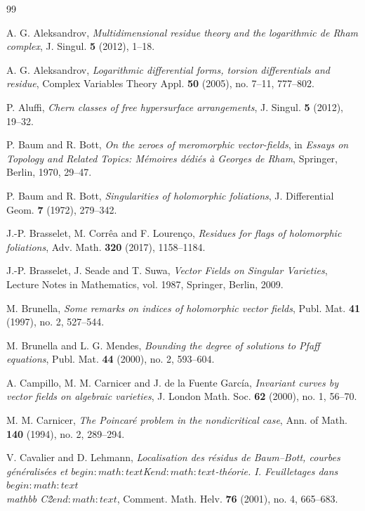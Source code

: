 \documentclass[12pt,reqno,a4paper]{amsart}
\numberwithin{equation}{section}
\theoremstyle{plain}
\theoremstyle{definition}
\begin{document}
\begin{thebibliography}{99}

A. G. Aleksandrov,
\textit{Multidimensional residue theory and the logarithmic de Rham complex},
J. Singul. \textbf{5} (2012), 1--18.

A. G. Aleksandrov,
\textit{Logarithmic differential forms, torsion differentials and residue},
Complex Variables Theory Appl. \textbf{50} (2005), no. 7--11, 777--802.

P. Aluffi,
\textit{Chern classes of free hypersurface arrangements},
J. Singul. \textbf{5} (2012), 19--32.

P. Baum and R. Bott,
\textit{On the zeroes of meromorphic vector-fields},
in \textit{Essays on Topology and Related Topics: M\'emoires d\'edi\'es \`a Georges de Rham},
Springer, Berlin, 1970, 29--47.

P. Baum and R. Bott,
\textit{Singularities of holomorphic foliations},
J. Differential Geom. \textbf{7} (1972), 279--342.

J.-P. Brasselet, M. Corr\^ea and F. Louren\c co,
\textit{Residues for flags of holomorphic foliations},
Adv. Math. \textbf{320} (2017), 1158--1184.

J.-P. Brasselet, J. Seade and T. Suwa,
\textit{Vector Fields on Singular Varieties},
Lecture Notes in Mathematics, vol. 1987, Springer, Berlin, 2009.

M. Brunella,
\textit{Some remarks on indices of holomorphic vector fields},
Publ. Mat. \textbf{41} (1997), no. 2, 527--544.

M. Brunella and L. G. Mendes,
\textit{Bounding the degree of solutions to Pfaff equations},
Publ. Mat. \textbf{44} (2000), no. 2, 593--604.

A. Campillo, M. M. Carnicer and J. de la Fuente Garc\'ia,
\textit{Invariant curves by vector fields on algebraic varieties},
J. London Math. Soc. \textbf{62} (2000), no. 1, 56--70.

M. M. Carnicer,
\textit{The Poincar\'e problem in the nondicritical case},
Ann. of Math. \textbf{140} (1994), no. 2, 289--294.

V. Cavalier and D. Lehmann,
\textit{Localisation des r\'esidus de Baum--Bott, courbes g\'en\'eralis\'ees et $begin:math:text$K$end:math:text$-th\'eorie. I. Feuilletages dans $begin:math:text$\\mathbb C\^2$end:math:text$},
Comment. Math. Helv. \textbf{76} (2001), no. 4, 665--683.


\end{thebibliography}
\end{document}
